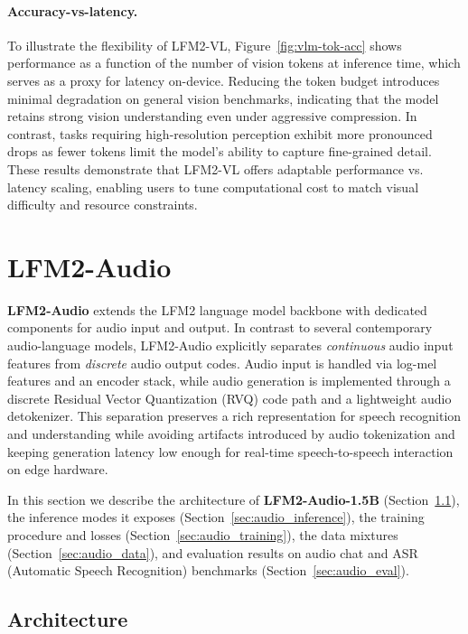 \documentclass{article}
\begin{document}
\paragraph{Accuracy-vs-latency.} To illustrate the flexibility of LFM2-VL, Figure~\ref{fig:vlm-tok-acc} shows performance as a function of the number of vision tokens at inference time, which serves as a proxy for latency on-device. Reducing the token budget introduces minimal degradation on general vision benchmarks, indicating that the model retains strong vision understanding even under aggressive compression. In contrast, tasks requiring high-resolution perception exhibit more pronounced drops as fewer tokens limit the model’s ability to capture fine-grained detail. These results demonstrate that LFM2-VL offers adaptable performance vs. latency scaling, enabling users to tune computational cost to match visual difficulty and resource constraints.


\section{LFM2-Audio}
\label{sec:audio}
\textbf{LFM2-Audio} extends the LFM2 language model backbone with dedicated components for audio input and output. In contrast to several contemporary audio-language models, LFM2-Audio explicitly separates \emph{continuous} audio input features from \emph{discrete} audio output codes. Audio input is handled via log-mel features and an encoder stack, while audio generation is implemented through a discrete Residual Vector Quantization (RVQ) code path and a lightweight audio detokenizer. This separation preserves a rich representation for speech recognition and understanding while avoiding artifacts introduced by audio tokenization and keeping generation latency low enough for real-time speech-to-speech interaction on edge hardware.

In this section we describe the architecture of \textbf{LFM2-Audio-1.5B} (Section~\ref{sec:audio_arch}), the inference modes it exposes (Section~\ref{sec:audio_inference}), the training procedure and losses (Section~\ref{sec:audio_training}), the data mixtures (Section~\ref{sec:audio_data}), and evaluation results on audio chat and ASR (Automatic Speech Recognition) benchmarks (Section~\ref{sec:audio_eval}).


\subsection{Architecture}
\label{sec:audio_arch}
\end{document}
